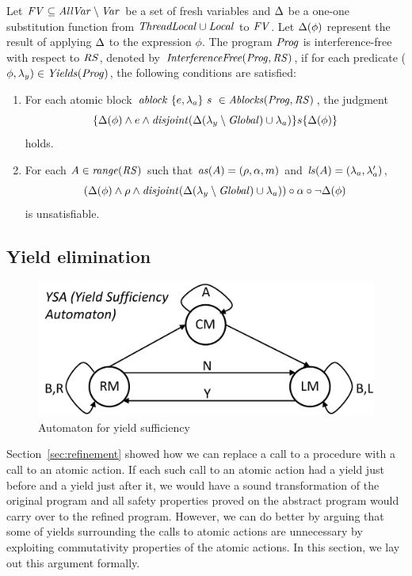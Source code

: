 Let $\mathit{FV} \subseteq \mathit{AllVar} \setminus \mathit{Var}$ be a set of fresh variables and $\Delta$ be a one-one 
substitution function from $\mathit{ThreadLocal} \cup \mathit{Local}$ to $\mathit{FV}$.
Let $\Delta(\phi)$ represent the result of applying $\Delta$ to the expression $\phi$.
The program $\mathit{Prog}$ is interference-free with respect to $\mathit{RS}$, denoted by $\mathit{InterferenceFree}(\mathit{Prog},\mathit{RS})$,
if for each predicate ($\phi,\lambda_y) \in \mathit{Yields}(\mathit{Prog})$, the following conditions are satisfied:
\begin{enumerate}
\item
For each atomic block $\mathit{ablock}\ {\{e,\lambda_a\}}\ {s}\  \in \mathit{Ablocks}(\mathit{Prog},\mathit{RS})$, the judgment
\[
\{\Delta(\phi) \wedge e \wedge \mathit{disjoint}(\Delta(\lambda_y \setminus \mathit{Global}) \cup \lambda_a)\} s \{\Delta(\phi)\}
\]
holds.
\item
For each $A \in \mathit{range}(\mathit{RS})$ such that $\mathit{as}(A) = (\rho, \alpha, m)$ and $\mathit{ls}(A) = (\lambda_a,\lambda'_a)$, 
\[
(\Delta(\phi) \wedge \rho \wedge \mathit{disjoint}(\Delta(\lambda_y \setminus \mathit{Global}) \cup \lambda_a)) \circ \alpha \circ \neg\Delta(\phi)
\]
is unsatisfiable.
\end{enumerate}

\subsection{Yield elimination}
\label{sec:yield-elimination}

\begin{figure}
\includegraphics[scale=0.35]{YieldTypeCheckingAutomaton.pdf}
\caption{Automaton for yield sufficiency}
\label{fig:YieldTypeCheckingAutomaton}
\end{figure}

Section~\ref{sec:refinement} showed how we can replace a call to a procedure with 
a call to an atomic action.
If each such call to an atomic action had a yield just before and a yield just after it,
we would have a sound transformation of the original program and all safety properties proved
on the abstract program would carry over to the refined program.
However, we can do better by arguing that some of yields surrounding the calls to atomic actions 
are unnecessary by exploiting commutativity properties of the atomic actions.
In this section, we lay out this argument formally.

